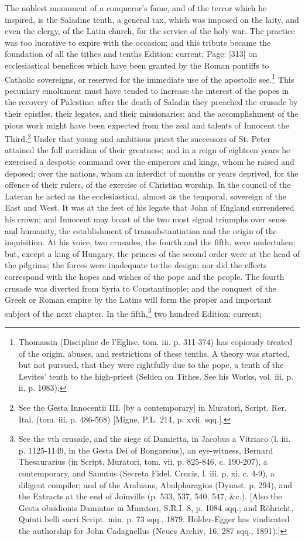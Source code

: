 The noblest monument of a conqueror\texthebrew{}’s fame, and of the terror which he inspired, is the Saladine tenth, a general tax, which was imposed on the laity, and even the clergy, of the Latin church, for the service of the holy war. The practice was too lucrative to expire with the occasion; and this tribute became the foundation of all the tithes and tenths Edition: current; Page: [313] on ecclesiastical benefices which have been granted by the Roman pontiffs to Catholic sovereigns, or reserved for the immediate use of the apostolic see.\footnote{Thomassin (Discipline de l\texthebrew{}’Eglise, tom. iii. p. 311-374) has copiously treated of the origin, abuses, and restrictions of these tenths. A theory was started, but not pursued, that they were rightfully due to the pope, a tenth of the Levites\texthebrew{}’ tenth to the high-priest (Selden on Tithes. See his Works, vol. iii. p. ii. p. 1083).} This pecuniary emolument must have tended to increase the interest of the popes in the recovery of Palestine; after the death of Saladin they preached the crusade by their epistles, their legates, and their missionaries; and the accomplishment of the pious work might have been expected from the zeal and talents of Innocent the Third.\footnote{See the Gesta Innocentii III. [by a contemporary] in Muratori, Script. Rer. Ital. (tom. iii. p. 486-568) [Migne, P.L. 214, p. xvii. sqq.].} Under that young and ambitious priest the successors of St. Peter attained the full meridian of their greatness; and in a reign of eighteen years he exercised a despotic command over the emperors and kings, whom he raised and deposed; over the nations, whom an interdict of months or years deprived, for the offence of their rulers, of the exercise of Christian worship. In the council of the Lateran he acted as the ecclesiastical, almost as the temporal, sovereign of the East and West. It was at the feet of his legate that John of England surrendered his crown; and Innocent may boast of the two most signal triumphs over sense and humanity, the establishment of transubstantiation and the origin of the inquisition. At his voice, two crusades, the fourth and the fifth, were undertaken; but, except a king of Hungary, the princes of the second order were at the head of the pilgrims; the forces were inadequate to the design; nor did the effects correspond with the hopes and wishes of the pope and the people. The fourth crusade was diverted from Syria to Constantinople; and the conquest of the Greek or Roman empire by the Latins will form the proper and important subject of the next chapter. In the fifth,\footnote{See the vth crusade, and the siege of Damietta, in Jacobus a Vitriaco (l. iii. p. 1125-1149, in the Gesta Dei of Bongarsius), an eye-witness, Bernard Thesaurarius (in Script. Muratori, tom. vii. p. 825-846, c. 190-207), a contemporary, and Sanutus (Secreta Fidel. Crucis, l. iii. p. xi. c. 4-9), a diligent compiler; and of the Arabians, Abulpharagius (Dynast. p. 294), and the Extracts at the end of Joinville (p. 533, 537, 540, 547, \&c.). [Also the Gesta obsidionis Damiatae in Muratori, S.R.I. 8, p. 1084 sqq.; and Rǒhricht, Quinti belli sacri Script. min. p. 73 sqq., 1879. Holder-Egger has vindicated the authorship for John Cadagnellus (Neues Archiv, 16, 287 sqq., 1891).]} two hundred Edition: current; 